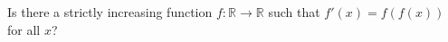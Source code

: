 Is there a strictly increasing function $f: \mathbb{R} \to \mathbb{R}$ such that $f'(x) = f(f(x))$ for all $x$?

